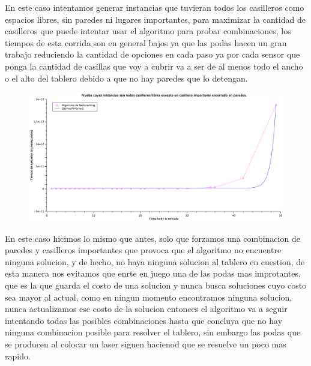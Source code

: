 En este caso intentamos generar instancias que tuvieran todos los casilleros como espacios libres, sin paredes ni lugares importantes, para maximizar la cantidad de casilleros que puede intentar usar el algoritmo para probar combinaciones, los tiempos de esta corrida son en general bajos ya que las podas hacen un gran trabajo reduciendo la cantidad de opciones en cada paso ya por cada sensor que ponga la cantidad de casillas que voy a cubrir va a ser de al menos todo el ancho o el alto del tablero debido a que no hay paredes que lo detengan.

\begin{figure}[H] %
\begin{center}
\includegraphics[width=460pt]{../imgs/graficoej3_todosUnoSinSolucion.png}
\end{center}
\end{figure}

En este caso hicimos lo mismo que antes, solo que forzamos una combinacion de paredes y casilleros importantes que provoca que el algoritmo no encuentre ninguna solucion, y de hecho, no haya ninguna solucion al tablero en cuestion, de esta  manera nos evitamos que enrte en juego una de las podas mas improtantes, que es la que guarda el costo de una solucion y nunca busca soluciones cuyo costo sea mayor al actual, como en ningun momento encontramos ninguna solucion, nunca actualizamos ese costo de la solucion entonces el algoritmo va a seguir intentando todas las posibles combinaciones hasta que concluya que no hay ninguna combinacion posible para resolver el tablero, sin embargo las podas que se producen al colocar un laser siguen hacienod que se resuelve un poco mas rapido.

